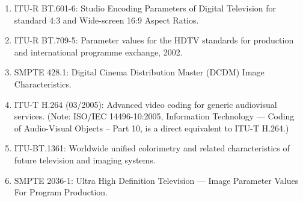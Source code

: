 \begin{enumerate}
\item ITU-R BT.601-6: Studio Encoding Parameters of Digital Television
for standard 4:3 and Wide-screen 16:9 Aspect Ratios.
\item ITU-R BT.709-5: Parameter values for the HDTV
standards for production and international programme exchange, 2002.
\item SMPTE 428.1: Digital Cinema Distribution Master (DCDM)
Image Characteristics.
\item ITU-T H.264 (03/2005): Advanced video coding for generic
audiovisual services.
(Note: ISO/IEC 14496-10:2005, Information Technology  — Coding of
Audio-Visual Objects – Part 10, is a direct equivalent to ITU-T H.264.)
\item ITU-BT.1361: Worldwide unified colorimetry and related
characteristics of future television and imaging systems.
\item SMPTE 2036-1: Ultra High Definition Television — Image
Parameter Values For Program Production.
\end{enumerate}
